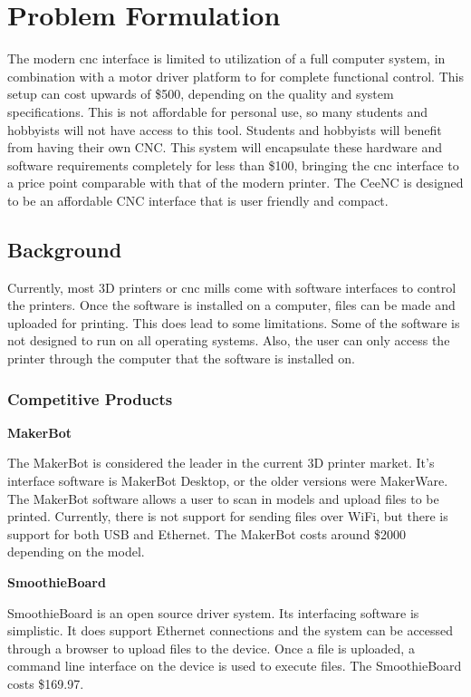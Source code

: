 \chapter{Problem Formulation}
The modern \gls{cnc} interface is limited to utilization of a full computer system, in combination with a motor driver platform to for complete functional control.
This setup can cost upwards of \$500, depending on the quality and system specifications.
This is not affordable for personal use, so many students and hobbyists will not have access to this tool.
Students and hobbyists will benefit from having their own CNC.
This system will encapsulate these hardware and software requirements completely for less than \$100, bringing the \gls{cnc} interface to a price point comparable with that of the modern printer. 
The CeeNC is designed to be an affordable CNC interface that is user friendly and compact.

\section{Background}

Currently, most 3D printers or \gls{cnc} mills come with software interfaces to control the printers.
Once the software is installed on a computer, files can be made and uploaded for printing.
This does lead to some limitations.
Some of the software is not designed to run on all operating systems.
Also, the user can only access the printer through the computer that the software is installed on.


\subsection{Competitive Products}


\textbf{MakerBot}

The MakerBot is considered the leader in the current 3D printer market.
It's interface software is MakerBot Desktop, or the older versions were MakerWare.
The MakerBot software allows a user to scan in models and upload files to be printed.
Currently, there is not support for sending files over WiFi, but there is support for both USB and Ethernet.
The MakerBot costs around \$2000 depending on the model.

\textbf{SmoothieBoard}

SmoothieBoard is an open source driver system.
Its interfacing software is simplistic.
It does support Ethernet connections and the system can be accessed through a browser to upload files to the device.
Once a file is uploaded, a command line interface on the device is used to execute files.
The SmoothieBoard costs \$169.97.


